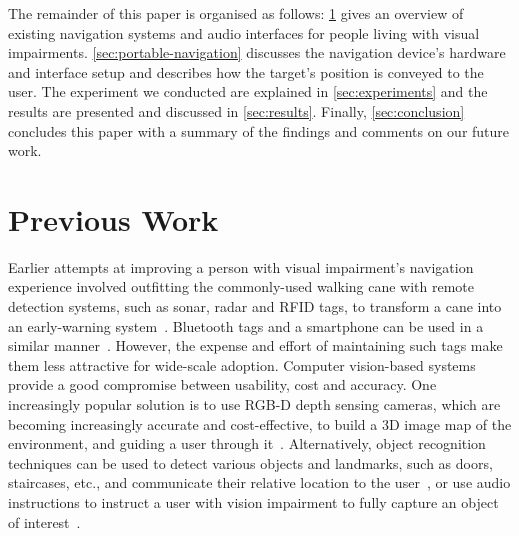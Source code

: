 \documentclass[sigconf, screen=true, anonymous=true]{acmart}
\begin{document}
The remainder of this paper is organised as follows: \cref{sec:lit-review} gives an overview of existing navigation systems and audio interfaces for people living with visual impairments.
\cref{sec:portable-navigation} discusses the navigation device's hardware and interface setup and describes how the target's position is conveyed to the user.
The experiment we conducted are explained in \cref{sec:experiments} and the results are presented and discussed in \cref{sec:results}. 
Finally, \cref{sec:conclusion} concludes this paper with a summary of the findings and comments on our future work. 

\section{Previous Work}\label{sec:lit-review}


Earlier attempts at improving a person with visual impairment's navigation experience involved outfitting the commonly-used walking cane with remote detection systems, such as sonar, radar and RFID tags, to transform a cane into an early-warning system~\cite{ulrich1997,marion2008batcane,faria2010electric,willis2005}.
Bluetooth tags and a smartphone can be used in a similar manner~\cite{sato2017navcog3}.
However, the expense and effort of maintaining such tags make them less attractive for wide-scale adoption.
Computer vision-based systems provide a good compromise between usability, cost and accuracy.
One increasingly popular solution is to use RGB-D depth sensing cameras, which are becoming increasingly accurate and cost-effective, to build a 3D image map of the environment, and guiding a user through it~\cite{lee2015, rodriguez2012obstacle}.
Alternatively, object recognition techniques can be used to detect various objects and landmarks, such as doors, staircases, etc., and communicate their relative location to the user~\cite{schauerte2012assistive, tian2013b, fiannaca2014headlock}, or use audio instructions to instruct a user with vision impairment to fully capture an object of interest~\cite{vazquez2012helping}. 
\end{document}
